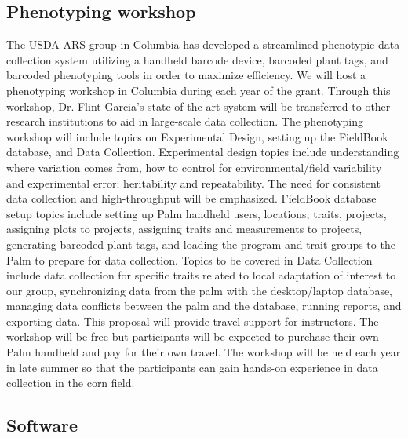 \subsection*{Phenotyping workshop} %

The USDA-ARS group in Columbia has developed a streamlined phenotypic data collection system utilizing a handheld barcode device, barcoded plant tags, and barcoded phenotyping tools in order to maximize efficiency.  We will host a phenotyping workshop in Columbia during each year of the grant.  Through this workshop, Dr. Flint-Garcia’s state-of-the-art system will be transferred to other research institutions to aid in large-scale data collection. The phenotyping workshop will include topics on Experimental Design, setting up the FieldBook database, and Data Collection.  Experimental design topics include understanding where variation comes from, how to control for environmental/field variability and experimental error; heritability and repeatability.  The need for consistent data collection and high-throughput will be emphasized.  FieldBook database setup topics include setting up Palm handheld users, locations, traits, projects, assigning plots to projects, assigning traits and measurements to projects,  generating barcoded plant tags, and loading the program and trait groups to the Palm to prepare for data collection.  Topics to be covered in Data Collection include data collection for specific traits related to local adaptation of interest to our group, synchronizing data from the palm with the desktop/laptop database, managing data conflicts between the palm and the database, running reports, and exporting data.  This proposal will provide travel support for instructors.  The workshop will be free but participants will be expected to purchase their own Palm handheld and pay for their own travel.  The workshop will be held each year in late summer so that the participants can gain hands-on experience in data collection in the corn field.

\subsection*{Software} %

